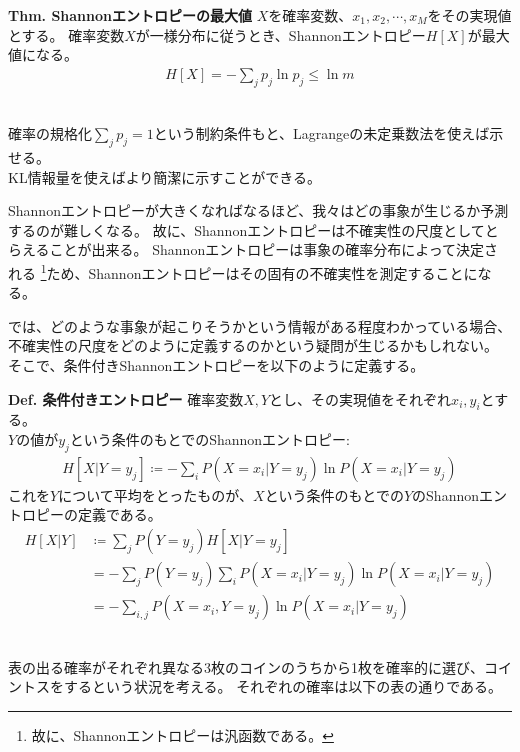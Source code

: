 \documentclass[a4paper,11pt]{jsarticle}
\begin{document}
\begin{itembox}[l]{\textbf{Thm. Shannonエントロピーの最大値}}
  $X$を確率変数、$x_1, x_2, \cdots, x_M$をその実現値とする。
  確率変数$X$が一様分布に従うとき、Shannonエントロピー$H[X]$が最大値になる。
  \begin{align*}
    H[X] = -\sum_j p_j \ln{p_j}\leq \ln{m}
  \end{align*}
\end{itembox}
\medskip
{}\\
確率の規格化$\sum_j p_j = 1$という制約条件もと、Lagrangeの未定乗数法を使えば示せる。\\
KL情報量を使えばより簡潔に示すことができる。

\medskip

Shannonエントロピーが大きくなればなるほど、我々はどの事象が生じるか予測するのが難しくなる。
故に、Shannonエントロピーは不確実性の尺度としてとらえることが出来る。
Shannonエントロピーは事象の確率分布によって決定される \footnote{故に、Shannonエントロピーは汎函数である。}ため、Shannonエントロピーはその固有の不確実性を測定することになる。

では、どのような事象が起こりそうかという情報がある程度わかっている場合、不確実性の尺度をどのように定義するのかという疑問が生じるかもしれない。\\
そこで、条件付きShannonエントロピーを以下のように定義する。

\begin{itembox}[l]{\textbf{Def. 条件付きエントロピー}}
  確率変数$X, Y$とし、その実現値をそれぞれ$x_i, y_i$とする。\\
  $Y$の値が$y_j$という条件のもとでのShannonエントロピー:
  \begin{align}
    H[X|Y=y_j] \coloneq - \sum_{i} P(X=x_i|Y=y_j) \ln{P(X=x_i|Y=y_j)}
  \end{align}
  これを$Y$について平均をとったものが、$X$という条件のもとでの$Y$のShannonエントロピーの定義である。
  \begin{align}
    H[X|Y] &\coloneq \sum_{j} P(Y=y_j) H[X|Y=y_j]\\
    &= - \sum_{j} P(Y=y_j) \sum_{i} P(X=x_i|Y=y_j) \ln{P(X=x_i|Y=y_j)}\\
    &= - \sum_{i, j} P(X=x_i, Y=y_j) \ln{P(X=x_i|Y=y_j)}
  \end{align}
\end{itembox}

\\
表の出る確率がそれぞれ異なる3枚のコインのうちから1枚を確率的に選び、コイントスをするという状況を考える。
それぞれの確率は以下の表の通りである。
\end{document}
